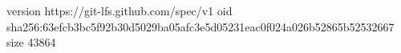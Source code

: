 version https://git-lfs.github.com/spec/v1
oid sha256:63efcb3bc5f92b30d5029ba05afc3e5d05231eac0f024a026b52865b52532667
size 43864
